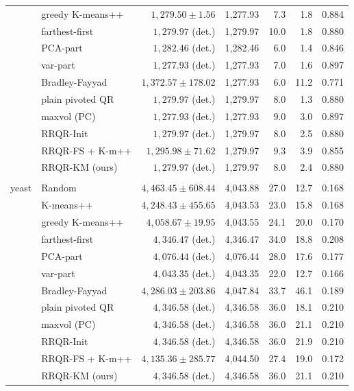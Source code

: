 \begin{table}[htbp]
{\begin{tabular}{llrrrrr}
 & greedy K-means++ & $1,279.50 \pm 1.56$ & 1,277.93 & 7.3 & 1.8 & 0.884 \\
 & farthest-first & $1,279.97$ (det.) & 1,279.97 & 10.0 & 1.8 & 0.880 \\
 & PCA-part & $1,282.46$ (det.) & 1,282.46 & 6.0 & 1.4 & 0.846 \\
 & var-part & $1,277.93$ (det.) & 1,277.93 & 7.0 & 1.6 & 0.897 \\
 & Bradley-Fayyad & $1,372.57 \pm 178.02$ & 1,277.93 & 6.0 & 11.2 & 0.771 \\
 & plain pivoted QR & $1,279.97$ (det.) & 1,279.97 & 8.0 & 1.3 & 0.880 \\
 & maxvol (PC) & $1,277.93$ (det.) & 1,277.93 & 9.0 & 3.0 & 0.897 \\
 & RRQR-Init & $1,279.97$ (det.) & 1,279.97 & 8.0 & 2.5 & 0.880 \\
 & RRQR-FS + K-m++ & $1,295.98 \pm 71.62$ & 1,279.97 & 9.3 & 3.9 & 0.855 \\
 & RRQR-KM (ours) & $1,279.97$ (det.) & 1,279.97 & 8.0 & 2.4 & 0.880 \\
\addlinespace \\
yeast & Random & $4,463.45 \pm 608.44$ & 4,043.88 & 27.0 & 12.7 & 0.168 \\
 & K-means++ & $4,248.43 \pm 455.65$ & 4,043.53 & 23.0 & 15.8 & 0.168 \\
 & greedy K-means++ & $4,058.67 \pm 19.95$ & 4,043.55 & 24.1 & 20.0 & 0.170 \\
 & farthest-first & $4,346.47$ (det.) & 4,346.47 & 34.0 & 18.8 & 0.208 \\
 & PCA-part & $4,076.44$ (det.) & 4,076.44 & 28.0 & 17.6 & 0.177 \\
 & var-part & $4,043.35$ (det.) & 4,043.35 & 22.0 & 12.7 & 0.166 \\
 & Bradley-Fayyad & $4,286.03 \pm 203.86$ & 4,047.84 & 33.7 & 46.1 & 0.189 \\
 & plain pivoted QR & $4,346.58$ (det.) & 4,346.58 & 36.0 & 18.1 & 0.210 \\
 & maxvol (PC) & $4,346.58$ (det.) & 4,346.58 & 36.0 & 21.1 & 0.210 \\
 & RRQR-Init & $4,346.58$ (det.) & 4,346.58 & 36.0 & 21.9 & 0.210 \\
 & RRQR-FS + K-m++ & $4,135.36 \pm 285.77$ & 4,044.50 & 27.4 & 19.0 & 0.172 \\
 & RRQR-KM (ours) & $4,346.58$ (det.) & 4,346.58 & 36.0 & 21.1 & 0.210 \\
\bottomrule
\end{tabular}}
\end{table}
